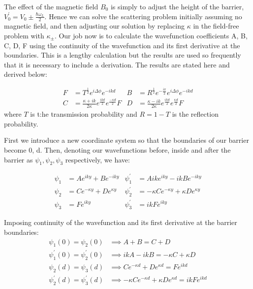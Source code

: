 \documentclass{article}
\begin{document}
The effect of the magnetic field $B_0$ is simply to adjust the height of the barrier, $V_0^{'} = V_0 \pm \frac{\hbar \omega_L}{2}$. Hence we can solve the scattering problem initially assuming no magnetic field, and then adjusting our solution by replacing $\kappa$ in the field-free problem with $\kappa_{\pm}$. Our job now is to calculate the wavefunction coefficients A, B, C, D, F using the continuity of the wavefunction and its first derivative at the boundaries.
This is a lengthy calculation but the results are used so frequently that it is necessary to include a derivation. The results are stated here and derived below:

\begin{align}
	F &= T^{\frac{1}{2}}e^{i\Delta\phi}e^{-ikd} & B &= R^{\frac{1}{2}}e^{-\frac{i\pi}{2}}e^{i\Delta\phi}e^{-ikd} \nonumber \\
	C &= \frac{\kappa+ik}{2\kappa}e^{\frac{ikd}{2}}e^{\frac{-\kappa d}{2}}F & D &= \frac{\kappa-ik}{2\kappa}e^{\frac{ikd}{2}}e^{\frac{\kappa d}{2}}F \label{cont0}
\end{align}
where $T$ is t:he transmission probability and $R = 1-T$ is the reflection probability.

First we introduce a new coordinate system so that the boundaries of our barrier become 0, d. Then, denoting our wavefunctions before, inside and after the barrier as $\psi_{1}, \psi_{2}, \psi_{3}$ respectively, we have:

\begin{align}
	\psi_{1} &= Ae^{iky} + Be^{-iky} & \psi_{1}^{'} &= Aike^{iky} - ikBe^{-iky} \\
	\psi_{2} &= Ce^{-\kappa y} + De^{\kappa y} & \psi_{2}^{'} &= -\kappa Ce^{-\kappa y} + \kappa De^{\kappa y} \\
	\psi_{3} &= Fe^{iky} & \psi_{3}^{'} &= ikFe^{iky}
\end{align}

Imposing continuity of the wavefunction and its first derivative at the barrier boundaries:
\begin{align}
	\psi_{1}(0) = \psi_{2}(0) &\implies A+B = C+D \label{cont1}\\
	\psi_{1}^{'}(0) = \psi_{2}^{'}(0) &\implies ikA - ikB = -\kappa C + \kappa D \label{cont2}\\
	\psi_{2}(d) = \psi_{3}(d) &\implies Ce^{-\kappa d} + De^{\kappa d} = Fe^{ikd} \label{cont3}\\
	\psi_{2}^{'}(d) = \psi_{3}^{'}(d) &\implies -\kappa Ce^{-\kappa d} + \kappa De^{\kappa d} = ikF e^{ikd} \label{cont4}
\end{align}
\end{document}

